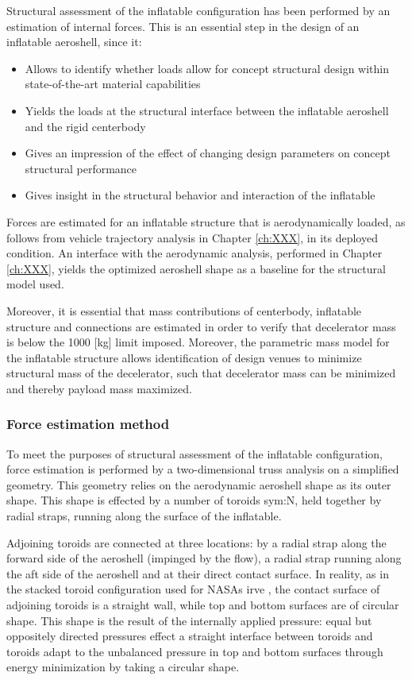 
Structural assessment of the inflatable configuration has been performed by an estimation of internal forces. This is an essential step in the design of an inflatable aeroshell, since it:
\begin{itemize}
\item Allows to identify whether loads allow for concept structural design within state-of-the-art material capabilities
\item Yields the loads at the structural interface between the inflatable aeroshell and the rigid centerbody
\item Gives an impression of the effect of changing design parameters on concept structural performance
\item Gives insight in the structural behavior and interaction of the inflatable
\end{itemize}
Forces are estimated for an inflatable structure that is aerodynamically loaded, as follows from vehicle trajectory analysis in Chapter \ref{ch:XXX}, in its deployed condition. An interface with the aerodynamic analysis, performed in Chapter \ref{ch:XXX}, yields the optimized aeroshell shape as a baseline for the structural model used. 

Moreover, it is essential that mass contributions of centerbody, inflatable structure and connections are estimated in order to verify that decelerator mass is below the 1000 [kg] limit imposed. Moreover, the parametric mass model for the inflatable structure allows identification of design venues to minimize structural mass of the decelerator, such that decelerator mass can be minimized and thereby payload mass maximized. 

\subsubsection{Force estimation method}

To meet the purposes of structural assessment of the inflatable configuration, force estimation is performed by a two-dimensional truss analysis on a simplified geometry. This geometry relies on the aerodynamic aeroshell shape as its outer shape. This shape is effected by a number of toroids \gls{sym:N}, held together by radial straps, running along the surface of the inflatable. 

Adjoining toroids are connected at three locations: by a radial strap along the forward side of the aeroshell (impinged by the flow), a radial strap running along the aft side of the aeroshell and at their direct contact surface. In reality, as in the stacked toroid configuration used for NASAs \gls{irve} \cite{Lindell2006}, the contact surface of adjoining toroids is a straight wall, while top and bottom surfaces are of circular shape. This shape is the result of the internally applied pressure: equal but oppositely directed pressures effect a straight interface between toroids and toroids adapt to the unbalanced pressure in top and bottom surfaces through energy minimization by taking a circular shape.

